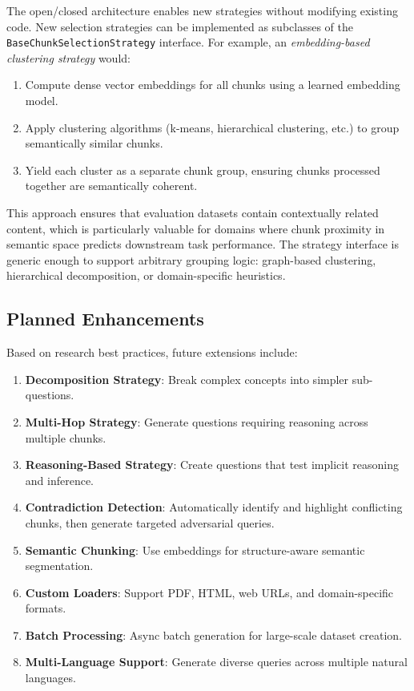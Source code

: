 \documentclass[11pt,a4paper]{article}
\begin{document}
The open/closed architecture enables new strategies without modifying existing code. New selection strategies can be implemented as subclasses of the \texttt{BaseChunkSelectionStrategy} interface. For example, an \textit{embedding-based clustering strategy} would:

\begin{enumerate}
    \item Compute dense vector embeddings for all chunks using a learned embedding model.
    \item Apply clustering algorithms (k-means, hierarchical clustering, etc.) to group semantically similar chunks.
    \item Yield each cluster as a separate chunk group, ensuring chunks processed together are semantically coherent.
\end{enumerate}

This approach ensures that evaluation datasets contain contextually related content, which is particularly valuable for domains where chunk proximity in semantic space predicts downstream task performance. The strategy interface is generic enough to support arbitrary grouping logic: graph-based clustering, hierarchical decomposition, or domain-specific heuristics.

\subsection{Planned Enhancements}

Based on research best practices, future extensions include:

\begin{enumerate}
    \item \textbf{Decomposition Strategy}: Break complex concepts into simpler sub-questions.

    \item \textbf{Multi-Hop Strategy}: Generate questions requiring reasoning across multiple chunks.

    \item \textbf{Reasoning-Based Strategy}: Create questions that test implicit reasoning and inference.

    \item \textbf{Contradiction Detection}: Automatically identify and highlight conflicting chunks, then generate targeted adversarial queries.

    \item \textbf{Semantic Chunking}: Use embeddings for structure-aware semantic segmentation.

    \item \textbf{Custom Loaders}: Support PDF, HTML, web URLs, and domain-specific formats.

    \item \textbf{Batch Processing}: Async batch generation for large-scale dataset creation.

    \item \textbf{Multi-Language Support}: Generate diverse queries across multiple natural languages.
\end{enumerate}
\end{document}
